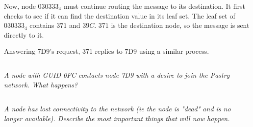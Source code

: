 \documentclass{article}
\newcommand{\question}[1]{\subsection{}\textit{#1}\bigskip}
\begin{document}
Now, node $ 030333_4 $ must continue routing the message to its destination.
It first checks to see if it can find the destination value in its leaf set.
The leaf set of $ 030333_4 $ contains $ 371 $ and $ 39C $.
$ 371 $ is the destination node, so the message is sent directly to it.

Answering 7D9's request, 371 replies to 7D9 using a similar process.


\question{A node with GUID 0FC contacts node 7D9 with a desire to join the Pastry network. What happens?}

\question{A node has lost connectivity to the network (ie the node is "dead" and is no longer available). Describe the most important things that will now happen.}
\end{document}
